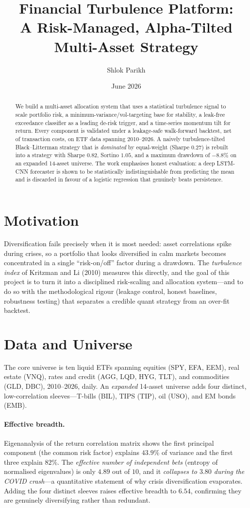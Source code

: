 \documentclass[11pt]{article}
\title{Financial Turbulence Platform:\\
A Risk-Managed, Alpha-Tilted Multi-Asset Strategy}
\author{Shlok Parikh}
\date{June 2026}
\begin{document}
\maketitle

\begin{abstract}
We build a multi-asset allocation system that uses a statistical turbulence signal to scale
portfolio risk, a minimum-variance/vol-targeting base for stability, a leak-free exceedance
classifier as a leading de-risk trigger, and a time-series momentum tilt for return. Every
component is validated under a leakage-safe walk-forward backtest, net of transaction costs, on
ETF data spanning 2010--2026. A naively turbulence-tilted Black--Litterman strategy that is
\emph{dominated} by equal-weight (Sharpe $0.27$) is rebuilt into a strategy with Sharpe $0.82$,
Sortino $1.05$, and a maximum drawdown of $-8.8\%$ on an expanded 14-asset universe. The work
emphasises honest evaluation: a deep LSTM-CNN forecaster is shown to be statistically
indistinguishable from predicting the mean and is discarded in favour of a logistic regression
that genuinely beats persistence.
\end{abstract}

\section{Motivation}
Diversification fails precisely when it is most needed: asset correlations spike during crises, so
a portfolio that looks diversified in calm markets becomes concentrated in a single ``risk-on/off''
factor during a drawdown. The \emph{turbulence index} of Kritzman and Li (2010) measures this
directly, and the goal of this project is to turn it into a disciplined risk-scaling and allocation
system---and to do so with the methodological rigour (leakage control, honest baselines, robustness
testing) that separates a credible quant strategy from an over-fit backtest.

\section{Data and Universe}
The core universe is ten liquid ETFs spanning equities (SPY, EFA, EEM), real estate (VNQ), rates and
credit (AGG, LQD, HYG, TLT), and commodities (GLD, DBC), 2010--2026, daily. An \emph{expanded}
14-asset universe adds four distinct, low-correlation sleeves---T-bills (BIL), TIPS (TIP), oil (USO),
and EM bonds (EMB).

\paragraph{Effective breadth.} Eigenanalysis of the return correlation matrix shows the first
principal component (the common risk factor) explains $43.9\%$ of variance and the first three
explain $82\%$. The \emph{effective number of independent bets} (entropy of normalised eigenvalues)
is only $4.89$ out of $10$, and it \emph{collapses to $3.80$ during the COVID crash}---a quantitative
statement of why crisis diversification evaporates. Adding the four distinct sleeves raises effective
breadth to $6.54$, confirming they are genuinely diversifying rather than redundant.
\end{document}
